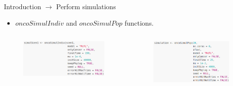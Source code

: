 \begin{frame}{Introduction $\rightarrow$ Perform simulations}

    \begin{itemize}
        \item $oncoSimulIndiv$ and $oncoSimulPop$ functions.
    \end{itemize}
    \begin{columns}
        \begin{column}{0.5\textwidth}
            \begin{figure}[t]
                \includegraphics[width=0.9\linewidth]{img/oncoSimulIndiv.png}
            \end{figure}
        \end{column}
        \begin{column}{0.5\textwidth}
            \begin{figure}[t]
                \includegraphics[width=0.9\linewidth]{img/oncoSimulPop.png}
            \end{figure}
        \end{column}
    \end{columns}
    
\end{frame}